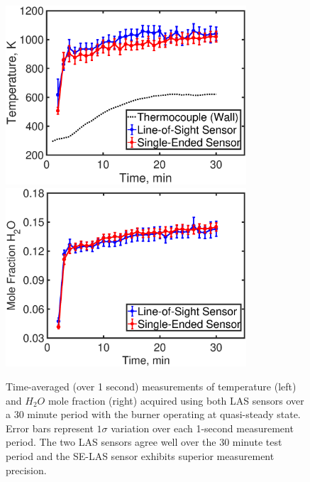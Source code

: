 \begin{figure} \centering 
\includegraphics[width=0.8\textwidth]{fig/ch4_fig10_2.eps}  
\includegraphics[width=0.8\textwidth]{fig/ch4_fig10_1.eps}  
\caption{Time-averaged (over 1 second) measurements of temperature (left) and $H_2O$ mole fraction (right) acquired using both LAS sensors over a 30 minute period with the burner operating at quasi-steady state. Error bars represent $1\sigma$ variation over each 1-second measurement period. The two LAS sensors agree well over the 30 minute test period and the SE-LAS sensor exhibits superior measurement precision.}
    \label{fig:ch4_11}
\end{figure}

